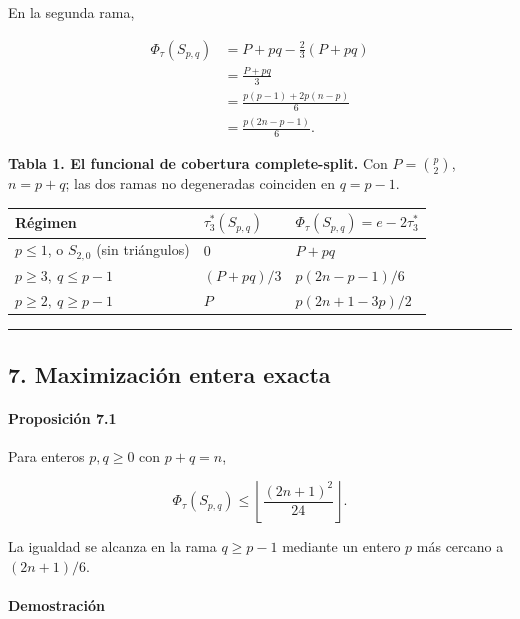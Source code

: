 \documentclass[spanish,11pt,a4paper]{article}
\newcounter{none}
\begin{document}
En la segunda rama,

\[
\begin{aligned}
\Phi_\tau(S_{p,q})
&=
P+pq-\frac23(P+pq)\\
&=
\frac{P+pq}{3}\\
&=
\frac{p(p-1)+2p(n-p)}6\\
&=
\frac{p(2n-p-1)}6.
\end{aligned}
\]

\textbf{Tabla 1. El funcional de cobertura complete-split.} Con
\(P=\binom p2\), \(n=p+q\); las dos ramas no degeneradas coinciden en
\(q=p-1\).

{\def\LTcaptype{none} %
\begin{longtable}[]{@{}lll@{}}
\toprule\noalign{}
Régimen & \(\tau_3^*(S_{p,q})\) & \(\Phi_\tau(S_{p,q})=e-2\tau_3^*\) \\
\midrule\noalign{}
\endhead
\bottomrule\noalign{}
\endlastfoot
\(p\le1\), o \(S_{2,0}\) (sin triángulos) & \(0\) & \(P+pq\) \\
\(p\ge3,\ q\le p-1\) & \((P+pq)/3\) & \(p(2n-p-1)/6\) \\
\(p\ge2,\ q\ge p-1\) & \(P\) & \(p(2n+1-3p)/2\) \\
\end{longtable}
}

\begin{center}\rule{0.5\linewidth}{0.5pt}\end{center}

\subsection{7. Maximización entera
exacta}\label{maximizaciuxf3n-entera-exacta}

\paragraph{Proposición 7.1}\label{proposiciuxf3n-7.1}

Para enteros \(p,q\ge0\) con \(p+q=n\),

\[
\Phi_\tau(S_{p,q})
\le
\left\lfloor\frac{(2n+1)^2}{24}\right\rfloor.
\]

La igualdad se alcanza en la rama \(q\ge p-1\) mediante un entero \(p\)
más cercano a \((2n+1)/6\).

\paragraph{Demostración}\label{demostraciuxf3n-11}
\end{document}
